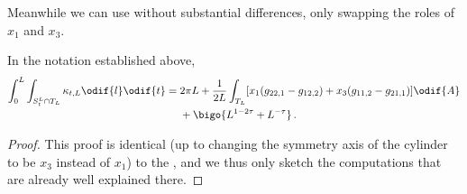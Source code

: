 \documentclass[titlepage,numbers=noenddot,oneside,%
cleardoublepage=empty,paper=a4,fontsize=11pt,%
english,%
]{scrartcl}
\newcommand*{\mathfullstop}{\,.}
\begin{document}
Meanwhile we can use \cite[Lemma 6.2]{brayHarmonicFunctionsMass2019} without substantial differences, only swapping the roles of \( x_1 \) and \( x_3 \).
\begin{lemma}\label{lem:geodesic_curvature_term}
    In the notation established above,
    \begin{equation*}
        \int_0^L \int_{S_t^L\cap T_L}\kappa_{t,L}\odif{l}\odif{t}=\begin{aligned}[t]
            &2\pi L+\frac{1}{2L}\int_{T_L}[x_1(g_{22,1}-g_{12,2})+x_3(g_{11,2}-g_{21,1})]\odif{A}\\
            &+\bigo{L^{1-2\tau}+L^{-\tau}}\mathfullstop
        \end{aligned}
    \end{equation*}
\end{lemma}
\begin{proof}
    This proof is identical (up to changing the symmetry axis of the cylinder to be \( x_3 \) instead of \( x_1 \)) to the \cite[proof of Lemma 6.2 in][]{brayHarmonicFunctionsMass2019}, and we thus only sketch the computations that are already well explained there.


\end{proof}
\end{document}
